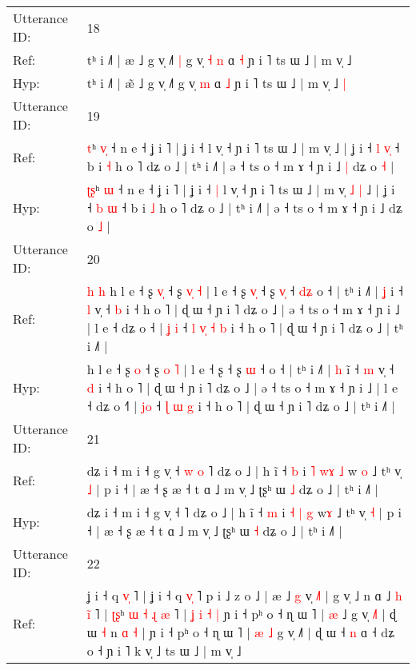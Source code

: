 \documentclass[10pt]{article}
\DeclareRobustCommand{\hl}[1]{{\textcolor{red}{#1}}}
\begin{document}
\begin{longtable}{ll}
 \\
\midrule
Utterance ID: & 18 \\
Ref: & tʰ i ˩˥ | æ\hl{} ˩ g v̩ ˩˥\hl{ }\hl{|} g v̩\hl{ }\hl{˧} \hl{n} ɑ \hl{˧} ɲ i ˥ ts ɯ ˩ | m v̩ ˩\hl{}\hl{}
 \\
Hyp: & tʰ i ˩˥ | æ\hl{̃} ˩ g v̩ ˩˥\hl{}\hl{} g v̩\hl{}\hl{} \hl{m} ɑ \hl{˩} ɲ i ˥ ts ɯ ˩ | m v̩ ˩\hl{ }\hl{|}
 \\
\midrule
Utterance ID: & 19 \\
Ref: & \hl{}\hl{t}ʰ \hl{v}\hl{̩} ˧ n e ˧ ʝ i ˥ | ʝ i ˧\hl{}\hl{} l v̩ ˧ ɲ i ˥ ts ɯ ˩ | m v̩\hl{}\hl{}\hl{}\hl{} ˩ | ʝ i ˧ \hl{l} \hl{v}\hl{̩} ˧ b i \hl{˧} h o ˥ dʑ o ˩ | tʰ i ˩˥ | ə ˧ ts o ˧ m ɤ ˧ ɲ i ˩\hl{ }\hl{|} dʑ o \hl{˧} |
 \\
Hyp: & \hl{ʈ}\hl{ʂ}ʰ \hl{}\hl{ɯ} ˧ n e ˧ ʝ i ˥ | ʝ i ˧\hl{ }\hl{|} l v̩ ˧ ɲ i ˥ ts ɯ ˩ | m v̩\hl{ }\hl{˩}\hl{ }\hl{|} ˩ | ʝ i ˧ \hl{b} \hl{}\hl{ɯ} ˧ b i \hl{˩} h o ˥ dʑ o ˩ | tʰ i ˩˥ | ə ˧ ts o ˧ m ɤ ˧ ɲ i ˩\hl{}\hl{} dʑ o \hl{˩} |
 \\
\midrule
Utterance ID: & 20 \\
Ref: & \hl{h}\hl{ }\hl{h}\hl{ }h l e ˧ ʂ \hl{v}\hl{̩} ˧ ʂ \hl{v}\hl{̩} \hl{˧} | l e ˧ ʂ\hl{ }\hl{v}\hl{̩} ˧ ʂ \hl{v}\hl{̩} ˧\hl{ }\hl{d}\hl{ʑ} o ˧ | tʰ i ˩˥ | \hl{ʝ} i\hl{} ˧ \hl{l} v̩ ˧ \hl{b} i ˧ h o ˥ | ɖ ɯ ˧ ɲ i ˥ dʑ o ˩ | ə ˧ ts o ˧ m ɤ ˧ ɲ i ˩ | l e ˧ dʑ o ˧\hl{} | \hl{ʝ}\hl{ }\hl{i} ˧\hl{ }\hl{l} \hl{v}\hl{̩} \hl{˧} \hl{b} i ˧ h o ˥ | ɖ ɯ ˧ ɲ i ˥ dʑ o ˩ | tʰ i ˩˥ |
 \\
Hyp: & \hl{}\hl{}\hl{}\hl{}h l e ˧ ʂ \hl{}\hl{o} ˧ ʂ \hl{}\hl{o} \hl{˥} | l e ˧ ʂ\hl{}\hl{}\hl{} ˧ ʂ \hl{}\hl{ɯ} ˧\hl{}\hl{}\hl{} o ˧ | tʰ i ˩˥ | \hl{h} i\hl{̃} ˧ \hl{m} v̩ ˧ \hl{d} i ˧ h o ˥ | ɖ ɯ ˧ ɲ i ˥ dʑ o ˩ | ə ˧ ts o ˧ m ɤ ˧ ɲ i ˩ | l e ˧ dʑ o ˧\hl{˥} | \hl{}\hl{j}\hl{o} ˧\hl{}\hl{} \hl{}\hl{ɭ} \hl{ɯ} \hl{g} i ˧ h o ˥ | ɖ ɯ ˧ ɲ i ˥ dʑ o ˩ | tʰ i ˩˥ |
 \\
\midrule
Utterance ID: & 21 \\
Ref: & dʑ i ˧ m i ˧ g v̩ ˧\hl{ }\hl{w}\hl{ }\hl{o} ˥ dʑ o ˩ | h ĩ ˧ \hl{b} i \hl{˥} \hl{w}\hl{ɤ} \hl{˩} w\hl{ }\hl{o} ˩ tʰ v̩ \hl{˩} | p i ˧ | æ ˧ ʂ æ ˧ t ɑ ˩ m v̩ ˩ ʈʂʰ ɯ \hl{˩} dʑ o ˩ | tʰ i ˩˥ |
 \\
Hyp: & dʑ i ˧ m i ˧ g v̩ ˧\hl{}\hl{}\hl{}\hl{} ˥ dʑ o ˩ | h ĩ ˧ \hl{m} i \hl{˧} \hl{}\hl{|} \hl{g} w\hl{}\hl{ɤ} ˩ tʰ v̩ \hl{˧} | p i ˧ | æ ˧ ʂ æ ˧ t ɑ ˩ m v̩ ˩ ʈʂʰ ɯ \hl{˧} dʑ o ˩ | tʰ i ˩˥ |
 \\
\midrule
Utterance ID: & 22 \\
Ref: & ʝ i ˧ q \hl{v}\hl{̩} ˥ | ʝ i ˧ q \hl{v}\hl{̩} ˥ p i ˩ z o ˩ | æ\hl{} ˩ \hl{g} v̩ \hl{˩}˥ | g v̩ ˩ n ɑ ˩\hl{ }\hl{h}\hl{ }\hl{i}\hl{̃}\hl{ }˥ | \hl{ʈ}\hl{ʂ}ʰ\hl{ }\hl{ɯ}\hl{ }\hl{˧} \hl{ɻ} \hl{æ}\hl{ }˥ |\hl{ }\hl{ʝ}\hl{ }\hl{i}\hl{ }\hl{˧} \hl{|} ɲ i ˧ pʰ o ˧ ɳ ɯ ˥ | \hl{æ} ˩ g v̩ \hl{˩}˥ | ɖ ɯ \hl{˧} n \hl{ɑ} \hl{˧} | ɲ i ˧ pʰ o ˧ ɳ ɯ ˥ | \hl{æ} \hl{˩} g v̩ ˩˥ | ɖ ɯ ˧ \hl{n} ɑ ˧ dʑ o ˧ ɲ i ˥ k v̩ ˩ ts ɯ ˩ | m v̩ ˩\hl{}\hl{}

\end{longtable}
\end{document}
